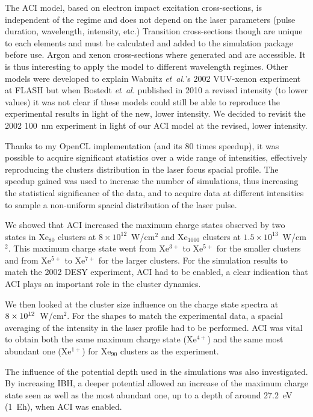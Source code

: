 The ACI model, based on electron impact excitation cross-sections, is independent of the
regime and does not depend on the laser parameters (pulse duration, wavelength,
intensity, etc.) Transition cross-sections though are unique to each elements
and must be calculated and added to the simulation package before use. Argon
and xenon cross-sections where generated and are accessible. It is thus
interesting to apply the model to different wavelength regimes. Other models were developed
to explain Wabnitz \textit{et~al.}'s 2002 VUV-xenon experiment at FLASH but when
Bostedt \textit{et~al.} published in 2010 a revised intensity (to lower values) it was
not clear if these models could still be able to reproduce the experimental results
in light of the new, lower intensity. We decided to revisit the 2002 100~nm
experiment in light of our ACI model at the revised, lower intensity.

Thanks to my OpenCL implementation (and its 80 times speedup), it was possible
to acquire significant statistics over a wide range of intensities, effectively
reproducing the clusters distribution in the laser focus spacial profile. The
speedup gained was used to increase the number of simulations, thus increasing
the statistical significance of the data, and to acquire data at different
intensities to sample a non-uniform spacial distribution of the laser pulse.

We showed that ACI increased the maximum charge states observed by two states in
Xe$_{80}$ clusters at $8\times10^{12}$~W/cm$^2$ and Xe$_{1000}$ clusters
at $1.5\times10^{13}$~W/cm$^2$. This maximum charge state went from Xe$^{3+}$ to
Xe$^{5+}$ for the smaller clusters and from Xe$^{5+}$ to Xe$^{7+}$ for the
larger clusters. For the simulation results to match the 2002 DESY experiment,
ACI had to be enabled, a clear indication that ACI plays an important role in
the cluster dynamics.

We then looked at the cluster size influence on the charge state spectra
at \\ $\ten{8}{12}$~W/cm$^2$. For the shapes to match the
experimental data, a spacial averaging of the intensity in the laser profile
had to be performed. ACI was vital to obtain both the same maximum charge state
(Xe$^{4+}$) and the same most abundant one (Xe$^{1+}$) for Xe$_{90}$ clusters
as the experiment.

The influence of the potential depth used in the simulations was also
investigated. By increasing IBH, a deeper potential allowed an increase of the
maximum charge state seen as well as the most abundant one, up to a depth
of around 27.2~eV (1~Eh), when ACI was enabled.


